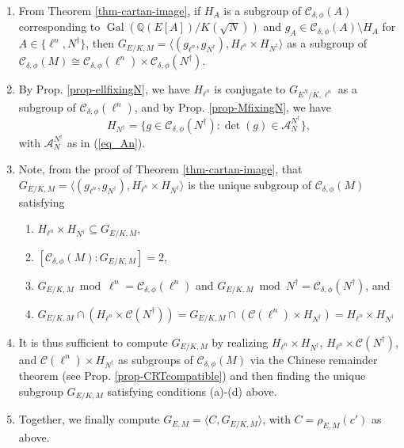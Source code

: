 \documentclass[11pt]{amsart}
\theoremstyle{definition}
\newcommand{\Q}{\mathbb{Q}}
\newcommand{\cC}{\mathcal{C}}
\newcommand{\Gal}{\operatorname{Gal}}
\begin{document}
\begin{enumerate}
    \item From Theorem \ref{thm-cartan-image}, if $H_{A}$ is a subgroup of $\mathcal{C}_{\delta, \phi}(A)$ corresponding to $\Gal(\Q(E[A])/K(\sqrt{N}))$ and $g_{A} \in \mathcal{C}_{\delta, \phi}(A) \setminus H_{A}$ for $A \in \{ \ell^n, N^\dagger \}$, then $G_{E/K, M} = \langle (g_{\ell^n}, g_{N^\dagger}), H_{\ell^n} \times H_{N^\dagger} \rangle$ as a subgroup of $\mathcal{C}_{\delta, \phi}(M) \cong \mathcal{C}_{\delta, \phi}(\ell^n) \times \mathcal{C}_{\delta, \phi}(N^\dagger)$.
    \item By Prop. \ref{prop-ellfixingN}, we have $H_{\ell^n}$ is conjugate to $G_{E^N/K, \ell^n}$ as a subgroup of $\mathcal{C}_{\delta, \phi}(\ell^n)$, and by Prop. \ref{prop-MfixingN}, we have 
    \[ H_{N^\dagger} = \{ g \in \mathcal{C}_{\delta, \phi}(N^\dagger) : \det(g) \in \mathcal{A}_{N}^{N^\dagger}  \}, \] with $\mathcal{A}_{N}^{N^\dagger} $ as in (\ref{eq_An}).
    \item Note, from the proof of Theorem \ref{thm-cartan-image}, that $G_{E/K, M} = \langle (g_{\ell^n}, g_{N^\dagger}), H_{\ell^n} \times H_{N^\dagger} \rangle$ is the unique subgroup of $\mathcal{C}_{\delta, \phi}(M)$ satisfying 
    \begin{enumerate}
        \item $H_{\ell^n} \times H_{N^\dagger} \subseteq G_{E/K, M}$,
        \item $[\mathcal{C}_{\delta, \phi}(M) : G_{E/K, M}] = 2$,
        \item $G_{E/K, M} \bmod{\ell^n} = \mathcal{C}_{\delta, \phi}(\ell^n)$ and $G_{E/K, M} \bmod{N^\dagger} = \mathcal{C}_{\delta, \phi}(N^\dagger)$, and 
        \item $G_{E/K, M} \cap (H_{\ell^n} \times \cC(N^\dagger)) = G_{E/K, M} \cap (\cC(\ell^n) \times H_{N^\dagger})=H_{\ell^n}\times H_{N^\dagger}$
    \end{enumerate}
    \item It is thus sufficient to compute $G_{E/K, M}$ by realizing $H_{\ell^n} \times H_{N^\dagger}$, $H_{\ell^n} \times \cC(N^\dagger)$, and $\cC(\ell^n) \times H_{N^\dagger}$ as subgroups of $\mathcal{C}_{\delta, \phi}(M)$ via the Chinese remainder theorem (see Prop. \ref{prop-CRTcompatible}) and then finding the unique subgroup $G_{E/K,M}$ satisfying conditions (a)-(d) above.
    \item Together, we finally compute $G_{E, M} = \langle C, G_{E/K, M} \rangle$, with $C=\rho_{E,M}(c')$ as above.
\end{enumerate}
\end{document}
